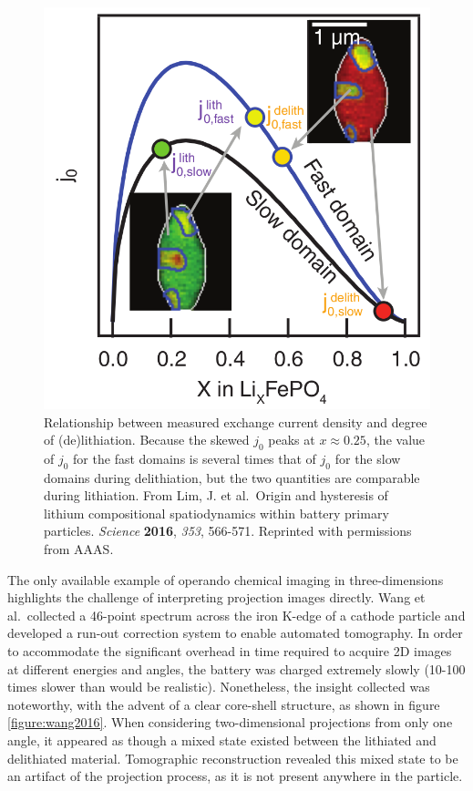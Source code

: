 \documentclass[journal=cmatex,manuscript=perspective]{achemso}
\begin{document}
\begin{figure}
  \includegraphics[width=\textwidth]{lim2016.png}
  \caption{Relationship between measured exchange current density and
    degree of (de)lithiation. Because the skewed $j_0$ peaks at $x
    \approx 0.25$, the value of $j_0$ for the fast domains is several
    times that of $j_0$ for the slow domains during delithiation, but
    the two quantities are comparable during lithiation. From Lim,
    J. et al.\ Origin and hysteresis of lithium compositional
    spatiodynamics within battery primary particles. \textit{Science}
    \textbf{2016}, \textit{353}, 566-571. Reprinted with permissions
    from AAAS.}
  \label{figure:lim2016}
\end{figure}

The only available example of operando chemical imaging in
three-dimensions highlights the challenge of interpreting projection
images directly. Wang et al.\ collected a 46-point spectrum across the
iron K-edge of a  cathode particle and developed a run-out
correction system to enable automated tomography. In order to
accommodate the significant overhead in time required to acquire 2D
images at different energies and angles, the battery was charged
extremely slowly (10-100 times slower than would be
realistic). Nonetheless, the insight collected was noteworthy, with
the advent of a clear core-shell structure, as shown in figure
\ref{figure:wang2016}. When considering two-dimensional projections
from only one angle, it appeared as though a mixed state existed
between the lithiated and delithiated material. Tomographic
reconstruction revealed this mixed state to be an artifact of the
projection process, as it is not present anywhere in the
particle\cite{wang2016}.
\end{document}
